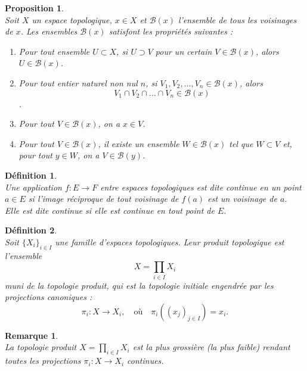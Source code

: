 \documentclass[a4paper, 14pt]{report}
\newtheorem{definition}{Définition}[section]
\newtheorem{remark}{Remarque}[section]
\newtheorem{proposition}{Proposition}[section]
\begin{document}
\begin{onehalfspace}
{\begin{proposition} \cite{bourbaki2013general} \\
Soit \( X \) un espace topologique, \( x \in X \) et \( \mathcal{B}(x) \) l'ensemble de tous les voisinages de \( x \). Les ensembles \( \mathcal{B}(x) \) satisfont les propriétés suivantes :
	\begin{enumerate}
		\item[(V$_1$)] Pour tout ensemble \( U \subset X \), si \( U \supset V \) pour un certain \( V \in \mathcal{B}(x) \), alors \( U \in \mathcal{B}(x) \).
		\item[(V$_2$)] Pour tout entier naturel non nul \( n \), si \( V_1, V_2, \dots, V_n \in \mathcal{B}(x) \), alors \[ V_1 \cap V_2 \cap \dots \cap V_n \in \mathcal{B}(x) \]  .
		\item[(V$_3$)] Pour tout \( V \in \mathcal{B}(x) \), on a \( x \in V \).
		\item[(V$_4$)] Pour tout \( V \in \mathcal{B}(x) \), il existe un ensemble \( W \in \mathcal{B}(x) \) tel que \( W \subset V \) et, pour tout \( y \in W \), on a \( V \in \mathcal{B}(y) \).
	\end{enumerate}
\end{proposition}


\begin{definition} \cite{bourbaki2013general} \\
Une application \( f : E \to F \) entre espaces topologiques est dite continue en un point \( a \in E \) si l'image réciproque de tout voisinage de \( f(a) \) est un voisinage de \( a \).\\
Elle est dite continue si elle est continue en tout point de \( E \).
\end{definition}


\begin{definition} \cite{bourbaki2013general}\\
Soit \(\{X_i\}_{i \in I}\) une famille d'espaces topologiques. Leur produit topologique est l'ensemble  
\[
X = \prod_{i \in I} X_i
\]
muni de la topologie produit, qui est la topologie initiale engendrée par les projections canoniques :
\[
\pi_i : X \to X_i, \quad \text{où} \quad \pi_i((x_j)_{j \in I}) = x_i.
\]
\end{definition}

\begin{remark} \cite{bourbaki2013general}\\
La topologie produit \(X = \prod_{i \in I} X_i \) est la plus grossière (la plus faible) rendant toutes les projections \(\pi_i : X \to X_i\) continues.
\end{remark}

}
\end{onehalfspace}
\end{document}
